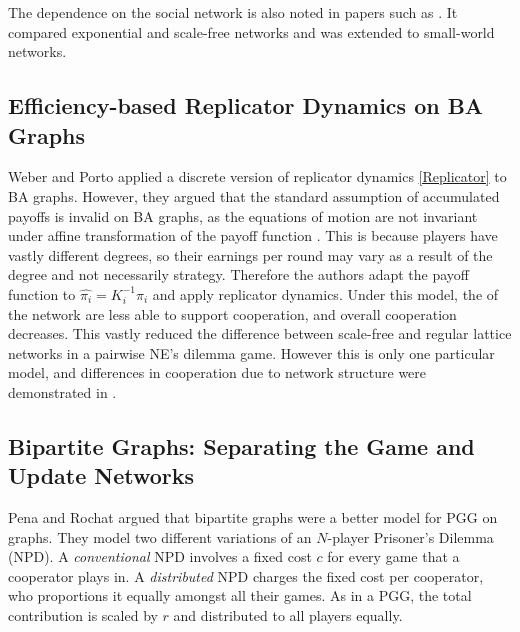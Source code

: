  \FloatBarrier
 \FloatBarrier
 
 
 The dependence on the social network is also noted in papers such as \cite{RN65}. It compared exponential and scale-free networks and was extended to small-world networks. 
 
 \subsection{Efficiency-based Replicator Dynamics on BA Graphs}
 Weber and Porto \cite{RN77} applied a discrete version of replicator dynamics \eqref{Replicator} to BA graphs. However, they argued that the standard assumption of accumulated payoffs is invalid on BA graphs, as the equations of motion are not invariant under affine transformation of the payoff function \cite{RN77}. This is because players have vastly different degrees, so their earnings per round may vary as a result of the degree and not necessarily strategy. Therefore the authors adapt the payoff function to $\hat{\pi_i} = K_i^{-1} \pi_i $ and apply replicator dynamics. Under this model, the  of the network are less able to support cooperation, and overall cooperation decreases. This vastly reduced the difference between scale-free and regular lattice networks in a pairwise NE's dilemma game. However this is only one particular model, and differences in cooperation due to network structure were demonstrated in \cite{RN62, RN44, RN43, RN28}.  
 
 
 \subsection{Bipartite Graphs: Separating the Game and Update Networks }
 


 Pena and Rochat \cite{RN48} argued that bipartite graphs were a better model for PGG on graphs. They model two different variations of an $N$-player Prisoner's Dilemma (NPD). A \emph{conventional} NPD involves a fixed cost $c$ for every game that a cooperator plays in. A \emph{distributed} NPD charges the fixed cost per cooperator, who proportions it equally amongst all their games. As in a PGG, the total contribution is scaled by $r$ and distributed to all players equally. \\
 

